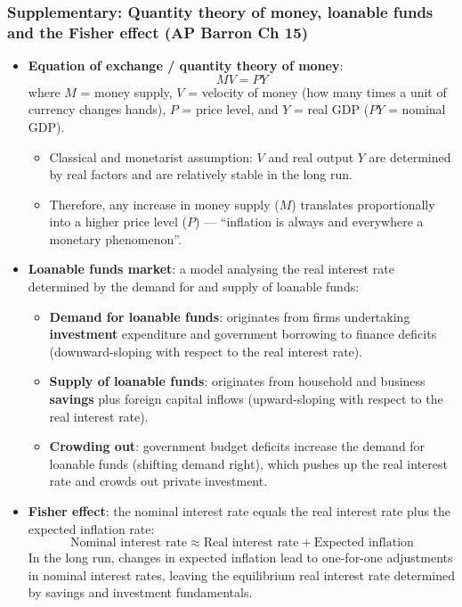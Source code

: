 \documentclass[a4paper,12pt]{article}
\newcommand{\needbold}[1]{\textcolor{red!70!black}{\textbf{#1}}}
\begin{document}
\subsubsection*{Supplementary: Quantity theory of money, loanable funds and the Fisher effect (AP Barron Ch 15)}
\begin{itemize}
  \item \needbold{Equation of exchange / quantity theory of money}:
  \[MV = PY\]
  where $M$ = money supply, $V$ = velocity of money (how many times a unit of currency changes hands), $P$ = price level, and $Y$ = real GDP ($PY$ = nominal GDP).
  \begin{itemize}
    \item Classical and monetarist assumption: $V$ and real output $Y$ are determined by real factors and are relatively stable in the long run.
    \item Therefore, any increase in money supply ($M$) translates proportionally into a higher price level ($P$) --- ``inflation is always and everywhere a monetary phenomenon''.
  \end{itemize}
  \item \needbold{Loanable funds market}: a model analysing the real interest rate determined by the demand for and supply of loanable funds:
  \begin{itemize}
    \item \textbf{Demand for loanable funds}: originates from firms undertaking \textbf{investment} expenditure and government borrowing to finance deficits (downward-sloping with respect to the real interest rate).
    \item \textbf{Supply of loanable funds}: originates from household and business \textbf{savings} plus foreign capital inflows (upward-sloping with respect to the real interest rate).
    \item \textbf{Crowding out}: government budget deficits increase the demand for loanable funds (shifting demand right), which pushes up the real interest rate and crowds out private investment.
  \end{itemize}
  \item \needbold{Fisher effect}: the nominal interest rate equals the real interest rate plus the expected inflation rate:
  \[\text{Nominal interest rate} \approx \text{Real interest rate} + \text{Expected inflation}\]
  In the long run, changes in expected inflation lead to one-for-one adjustments in nominal interest rates, leaving the equilibrium real interest rate determined by savings and investment fundamentals.
\end{itemize}
\end{document}
